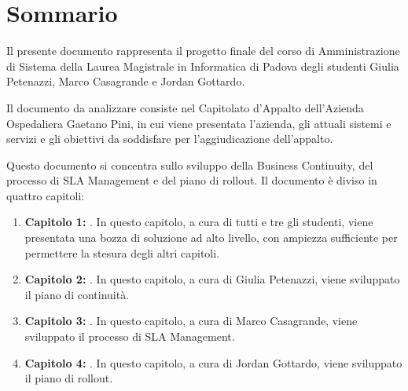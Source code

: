 
\cleardoublepage
{}
{}
\begingroup
\let\clearpage\relax
\let\cleardoublepage\relax
\let\cleardoublepage\relax

\chapter*{Sommario}

  Il presente documento rappresenta il progetto finale del corso di Amministrazione di Sistema della Laurea Magistrale in Informatica di Padova degli studenti Giulia Petenazzi, Marco Casagrande e Jordan Gottardo.


  Il documento da analizzare consiste nel Capitolato d'Appalto dell'Azienda Ospedaliera Gaetano Pini, in cui viene presentata l'azienda, gli attuali sistemi e servizi e gli obiettivi da soddisfare per l'aggiudicazione dell'appalto.


  Questo documento si concentra sullo sviluppo della Business Continuity, del processo di SLA Management e del piano di rollout. Il documento è diviso in quattro capitoli:
  \begin{enumerate}
  	\item \textbf{Capitolo 1: }. In questo capitolo, a cura di tutti e tre gli studenti, viene presentata una bozza di soluzione ad alto livello, con ampiezza sufficiente per permettere la stesura degli altri capitoli.
    \item \textbf{Capitolo 2: }. In questo capitolo, a cura di Giulia Petenazzi, viene sviluppato il piano di continuità.
    \item \textbf{Capitolo 3: }. In questo capitolo, a cura di Marco Casagrande, viene sviluppato il processo di SLA Management.
    \item \textbf{Capitolo 4: }. In questo capitolo, a cura di Jordan Gottardo, viene sviluppato il piano di rollout.
  \end{enumerate}



  \endgroup			

  \vfill

